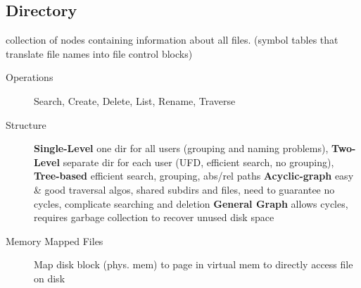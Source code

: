 \subsection*{Directory}
collection of nodes containing information about all files. (symbol tables that translate file names into file control blocks)
\begin{description}
    \item[Operations]Search, Create, Delete, List, Rename, Traverse
    \item[Structure] \textbf{Single-Level} one dir for all users (grouping and naming problems), \textbf{Two-Level} separate dir for each user (UFD, efficient search, no grouping), \textbf{Tree-based} efficient search, grouping, abs/rel paths \textbf{Acyclic-graph} easy \& good traversal algos, shared subdirs and files, need to guarantee no cycles, complicate searching and deletion \textbf{General Graph} allows cycles, requires garbage collection to recover unused disk space %
    \item[Memory Mapped Files] Map disk block (phys. mem) to page in virtual mem to directly access file on disk
\end{description}
